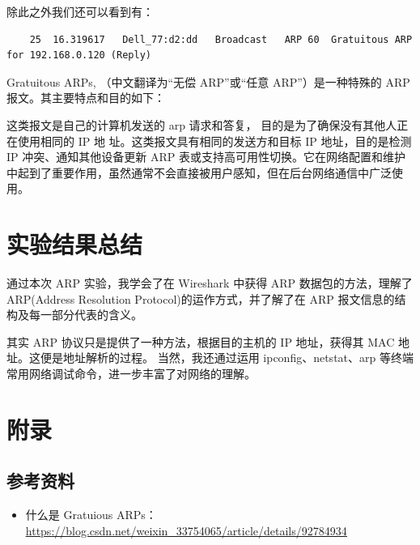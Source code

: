 \documentclass[14pt,a4paper,UTF8,twoside]{article}
\begin{document}
除此之外我们还可以看到有：

\begin{lstlisting}
    25	16.319617	Dell_77:d2:dd	Broadcast	ARP	60	Gratuitous ARP for 192.168.0.120 (Reply)
\end{lstlisting}

Gratuitous ARPs, （中文翻译为“无偿 ARP”或“任意 ARP”）是一种特殊的 ARP 报文。其主要特点和目的如下：

这类报文是自己的计算机发送的 arp 请求和答复，
目的是为了确保没有其他人正在使用相同的 IP 地
址。这类报文具有相同的发送方和目标 IP 地址，目的是检测 IP 冲突、通知其他设备更新 ARP 表或支持高可用性切换。它在网络配置和维护中起到了重要作用，虽然通常不会直接被用户感知，但在后台网络通信中广泛使用。



\section{实验结果总结}

通过本次 ARP 实验，我学会了在 Wireshark 中获得 ARP 数据包的方法，理解了 ARP(Address 
Resolution Protocol)的运作方式，并了解了在 ARP 报文信息的结构及每一部分代表的含义。

其实 ARP 协议只是提供了一种方法，根据目的主机的 IP 地址，获得其 MAC 地址。这便是地址解析的过程。
当然，我还通过运用 ipconfig、netstat、arp 等终端常用网络调试命令，进一步丰富了对网络的理解。

\section{附录}

\subsection*{参考资料}

\begin{itemize}
    \item 什么是 Gratuious ARPs：\href{https://blog.csdn.net/weixin_33754065/article/details/92784934}{\underline{https://blog.csdn.net/weixin\_33754065/article/details/92784934}}
\end{itemize}
\end{document}
